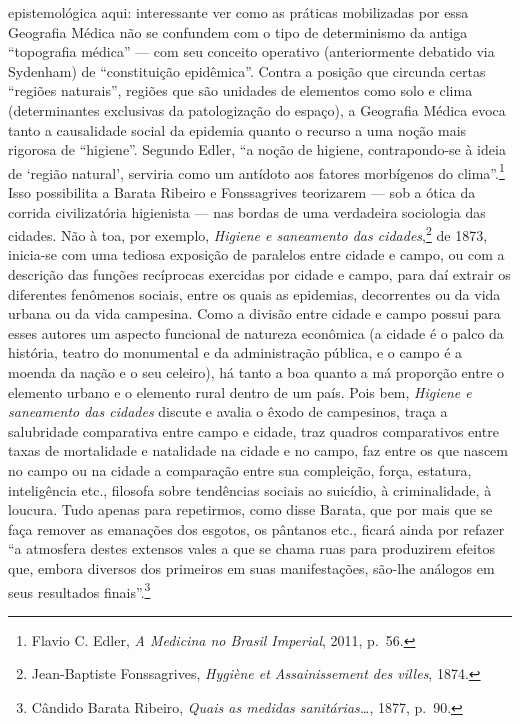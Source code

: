 epistemológica aqui: interessante ver como as práticas mobilizadas por
essa Geografia Médica não se confundem com o tipo de determinismo da
antiga ``topografia médica'' --- com seu conceito operativo
(anteriormente debatido via Sydenham) de ``constituição epidêmica''.
Contra a posição que circunda certas ``regiões naturais'', regiões que
são unidades de elementos como solo e clima (determinantes exclusivas da
patologização do espaço), a Geografia Médica evoca tanto a causalidade
social da epidemia quanto o recurso a uma noção mais rigorosa de
``higiene''. Segundo Edler, ``a noção de higiene, contrapondo-se à ideia
de `região natural', serviria como um antídoto aos fatores morbígenos do
clima''.\footnote{Flavio C. Edler, \textit{A Medicina no Brasil Imperial},
  2011, p.~56.} Isso possibilita a Barata Ribeiro e Fonssagrives
teorizarem --- sob a ótica da corrida civilizatória higienista --- nas
bordas de uma verdadeira sociologia das cidades. Não à toa, por exemplo,
\textit{Higiene e saneamento das cidades},\footnote{Jean-Baptiste
  Fonssagrives, \textit{Hygiène et Assainissement des villes}, 1874.} de
1873, inicia-se com uma tediosa exposição de paralelos entre cidade e
campo, ou com a descrição das funções recíprocas exercidas por cidade e
campo, para daí extrair os diferentes fenômenos sociais, entre os quais
as epidemias, decorrentes ou da vida urbana ou da vida campesina. Como a
divisão entre cidade e campo possui para esses autores um aspecto
funcional de natureza econômica (a cidade é o palco da história, teatro
do monumental e da administração pública, e o campo é a moenda da nação
e o seu celeiro), há tanto a boa quanto a má proporção entre o elemento
urbano e o elemento rural dentro de um país. Pois bem, \textit{Higiene e
saneamento das cidades} discute e avalia o êxodo de campesinos, traça a
salubridade comparativa entre campo e cidade, traz quadros comparativos
entre taxas de mortalidade e natalidade na cidade e no campo, faz entre
os que nascem no campo ou na cidade a comparação entre sua compleição,
força, estatura, inteligência etc., filosofa sobre tendências sociais ao
suicídio, à criminalidade, à loucura. Tudo apenas para repetirmos, como
disse Barata, que por mais que se faça remover as emanações dos esgotos,
os pântanos etc., ficará ainda por refazer ``a atmosfera destes extensos
vales a que se chama ruas para produzirem efeitos que, embora diversos
dos primeiros em suas manifestações, são-lhe análogos em seus resultados
finais''.\footnote{Cândido Barata Ribeiro, \textit{Quais as medidas
  sanitárias\ldots{}}, 1877, p.~90.}

